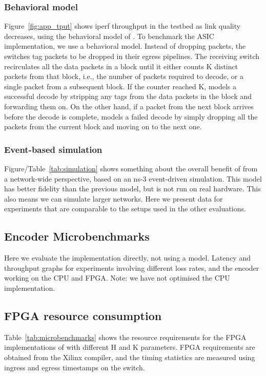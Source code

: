 \subsubsection{Behavioral model}
Figure~\ref{fig:app_tput} shows iperf throughput in the testbed as link quality
decreases, using the behavioral model of \OurSys.
To benchmark the ASIC implementation, we use a behavioral model. Instead  of
dropping packets, the switches tag packets to be dropped in their  egress
pipelines. The receiving switch recirculates all the data packets in a block 
until it either counts K distinct packets from that block, i.e., the number of packets 
required to decode, or a single packet from a subsequent block. If the counter 
reached K, \OurSys models a successful decode by stripping any tags from the 
data packets in the block and forwarding them on. On the other hand, if 
a packet from the next block arrives before the decode is complete, \OurSys 
models a failed decode by simply dropping all the packets from the current 
block and moving on to the next one. 


\subsubsection{Event-based simulation}
Figure/Table~\ref{tab:simulation} shows something about the overall benefit of \OurSys from a network-wide perspective, based on an ns-3 event-driven simulation.
This model has better fidelity than the previous model, but is not run on real hardware. This also means we can simulate larger networks. Here we present data for experiments that are comparable to the setups used in the other evaluations.


\subsection{Encoder Microbenchmarks}
Here we evaluate the implementation directly, not using a model.
Latency and throughput graphs for experiments involving different loss rates, and the encoder working on the CPU and FPGA.
Note: we have not optimised the CPU implementation.


\subsection{FPGA resource consumption}
Table~\ref{tab:microbenchmarks} shows the resource requirements for the FPGA implementations of
\OurSys with different H and K parameters.
FPGA requirements are obtained from the Xilinx compiler, and the
timing statistics are measured using ingress and egress timestamps on
the switch.

